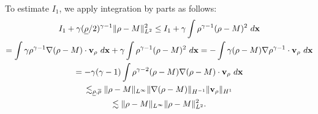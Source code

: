 \documentclass[11pt]{article}
\theoremstyle{plain}
\theoremstyle{definition}
\theoremstyle{remark}
\newcommand{\dv}{\mathrm{div}\, }
\renewcommand{\vec}[1]{{\bf #1}}
\newcommand{\idx}{\ d\vec x}
\newcommand{\norm}[2]{\Vert #1 \Vert_{#2}}
\numberwithin{equation}{section}
\begin{document}
To estimate $ I_1 $, we apply integration by parts as follows: %
\begin{equation}
    \label{est:001-5} 
\begin{gathered}
    I_1 + \gamma (\underline\rho/2)^{\gamma-1} \norm{\rho-M}{L^2}^2 \leq I_1 + \gamma \int \rho^{\gamma-1} (\rho - M)^2\idx \\
    = \int \gamma  \rho^{\gamma-1} \nabla (\rho - M) \cdot \vec v_\rho \idx + \gamma \int \rho^{\gamma-1} (\rho - M)^2\idx = - \int \gamma (\rho - M) \nabla \rho^{\gamma-1} \cdot \vec v_\rho \idx  \\
    = - \gamma(\gamma-1) \int \rho^{\gamma-2} (\rho-M) \nabla (\rho - M) \cdot \vec v_\rho \idx  \\
    \lesssim_{\underline\rho, \overline\rho} %
    \norm{\rho-M}{L^\infty} \norm{\nabla(\rho-M)}{H^{-1}} \norm{\vec v_\rho}{H^1} \\
    \lesssim \norm{\rho-M}{L^\infty} \norm{\rho-M}{L^2}^2.
\end{gathered}
\end{equation}
\end{document}
